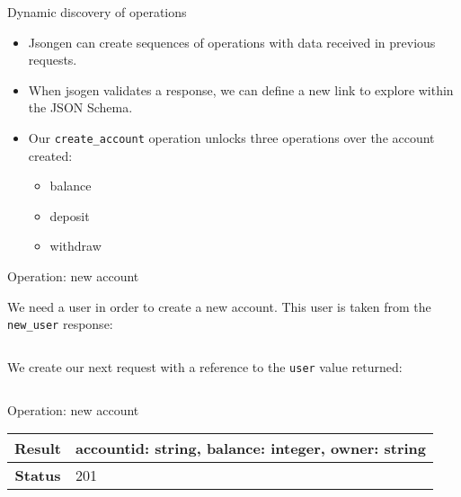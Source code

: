 \begin{frame}{Dynamic discovery of operations}%
  \begin{itemize}
  \item Jsongen can create sequences of operations with data received
    in previous requests.

  \item When jsogen validates a response, we can define a new link to
    explore within the JSON Schema.
  \item Our \texttt{create\_account} operation unlocks three
    operations over the account created:%
    \begin{itemize}
    \item balance
    \item deposit
    \item withdraw
    \end{itemize}
  \end{itemize}

\end{frame}

\begin{frame}{Operation: new account}

  We need a user in order to create a new account. This user is taken
  from the \texttt{new\_user} response:

  \centering
  \inputminted{js}{./code/example2_user_response-gen.jsch}

  \pause

  We create our next request with a reference to the \texttt{user}
  value returned:

  \centering
  \inputminted{js}{./code/example2_new_account.jsch}
\end{frame}

\begin{frame}{Operation: new account}
  \centering
  \begin{tabular}{| c | l |}
    \hline
    \textbf{Result}    & accountid: string, balance: integer, owner: string\\ \hline
    \textbf{Status}    & 201 \\ \hline
  \end{tabular}
  \centering
  \inputminted{js}{./code/example2_new_account_response.jsch}
\end{frame}


